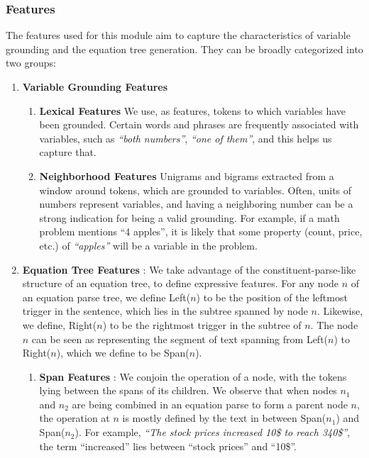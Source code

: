     \subsubsection{Features}
      The features used for this module aim to capture the characteristics of
      variable grounding and the equation tree generation. They can be
      broadly categorized into two groups:
      \begin{enumerate}
        \item \textbf{Variable Grounding Features} 
          \begin{enumerate}
            \item \textbf{Lexical Features} We use, as features,
              tokens to which variables have been grounded. Certain
              words and phrases are frequently associated with
              variables, such as {\em ``both numbers''}, {\em ``one of them''},
              and this helps us capture that.
            \item \textbf{Neighborhood Features} Unigrams and bigrams
              extracted from a window around tokens, which are
              grounded to variables.  Often, units of numbers
              represent variables, and having a neighboring number can
              be a strong indication for being a valid grounding. For
              example, if a math problem mentions {``4 apples''}, it
              is likely that some property (count, price, etc.) of
              {\em``apples''} will be a variable in the problem.
          \end{enumerate}
        \item \textbf{Equation Tree Features} : We take advantage of
          the constituent-parse-like structure of an equation tree,
          to define expressive features. For any node $n$ of an
          equation parse tree, we define Left($n$) to be the position
          of the leftmost trigger in the sentence, which lies in the
          subtree spanned by node $n$.  Likewise, we define,
          Right($n$) to be the rightmost trigger in the subtree of
          $n$. The node $n$ can be seen as representing the segment of
          text spanning from Left($n$) to Right($n$), which we define to
          be Span($n$).
          \begin{enumerate}
            \item \textbf{Span Features} : We conjoin the operation of
              a node, with the tokens lying between the spans of its
              children. We observe that when nodes $n_1$ and $n_2$ are
              being combined in an equation parse to form a parent
              node $n$, the operation at $n$ is mostly defined by the
              text in between Span($n_1$) and Span($n_2$). For
              example, {\em``The stock prices increased 10\$ to reach
                340\$''}, the term ``increased'' lies between ``stock
              prices'' and ``10\$''.
            

\end{enumerate}
\end{enumerate}
